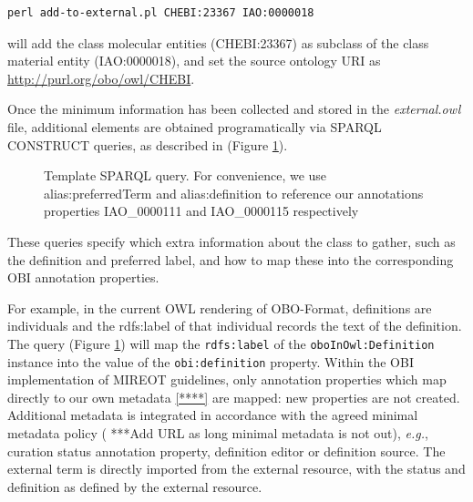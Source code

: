 \documentclass[a4paper,10pt,twocolumn]{article}
\begin{document}
\begin{footnotesize}
\begin{verbatim}
perl add-to-external.pl CHEBI:23367 IAO:0000018
\end{verbatim}
\end{footnotesize}

will add the class molecular entities (CHEBI:23367) as subclass of the class material entity (IAO:0000018), and set the source ontology URI as \url{http://purl.org/obo/owl/CHEBI}.

Once the minimum information has been collected  and stored in the \emph{external.owl} file, additional elements are obtained programatically via SPARQL\cite{RefWorks:1531} CONSTRUCT queries, as described in (Figure \ref{fig:sparql}).




\begin{figure}[t]
%  
\scriptsize
 
\caption{Template SPARQL query. For convenience, we use alias:preferredTerm and
alias:definition to reference our annotations properties IAO\_0000111 and IAO\_0000115 respectively}
\label{fig:sparql}
\end{figure}
These queries specify which extra information about the class to gather, such as the definition and preferred label, and how to map these into the corresponding OBI annotation properties. 

For example, in the current \ac{OWL} rendering of \ac{OBO}-Format, definitions are individuals and the rdfs:label of that individual records the text of the definition. %
The query (Figure \ref{fig:sparql}) will map the \texttt{rdfs:label} of the \texttt{oboInOwl:Definition} instance into the value of the \texttt{obi:definition} property.
Within the \ac{OBI} implementation of \ac{MIREOT} guidelines, only annotation properties which map directly to our own metadata \ref{****} are mapped: new properties are not created.
Additional metadata is integrated in accordance with the agreed minimal metadata policy ( ***Add URL as long minimal metadata is not out), \emph{e.g.}, curation status annotation property, definition editor or definition source.
The external term is directly imported from the external resource, with the status and definition as defined by the external resource. %
\end{document}

